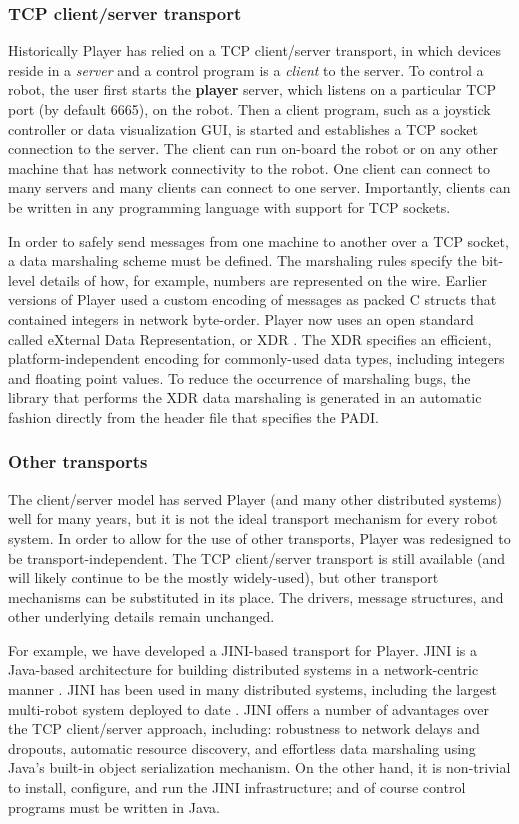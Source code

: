 \subsubsection{TCP client/server transport}
Historically Player has relied on a TCP client/server transport, in which
devices reside in a {\em server} and a control program is a {\em client} to
the server.  To control a robot, the user first starts the {\bf player}
server, which listens on a particular TCP port (by default 6665), on the
robot.  Then a client program, such as a joystick controller or data
visualization GUI, is started and establishes a TCP socket connection to
the server.  The client can run on-board the robot or on any other machine
that has network connectivity to the robot.  One client can connect to many
servers and many clients can connect to one server.  Importantly, clients
can be written in any programming language with support for TCP sockets.

In order to safely send messages from one machine to another over a TCP
socket, a data marshaling scheme must be defined.  The marshaling rules
specify the bit-level details of how, for example, numbers are represented
on the wire.  Earlier versions of Player used a custom encoding of messages
as packed C structs that contained integers in network byte-order.   Player
now uses an open standard called eXternal Data Representation, or XDR
\cite{32_RFC1014}.  The XDR specifies an efficient, platform-independent
encoding for commonly-used data types, including integers and floating
point values.  To reduce the occurrence of marshaling bugs, the library that
performs the XDR data marshaling is generated in an automatic fashion
directly from the header file that specifies the PADI.

\subsubsection{Other transports}
The client/server model has served Player (and many other distributed
systems) well for many years, but it is not the ideal transport mechanism
for every robot system.  In order to allow for the use of other transports,
Player was redesigned to be transport-independent.  The TCP client/server
transport is still available (and will likely continue to be the mostly
widely-used), but other transport mechanisms can be substituted in its
place.  The drivers, message structures, and other underlying details
remain unchanged.

For example, we have developed a JINI-based transport for Player.  JINI is
a Java-based architecture for building distributed systems in a
network-centric manner \cite{32_Waldo99}.  JINI has been used in many
distributed systems, including the largest multi-robot system deployed to
date \cite{32_iser04}.  JINI offers a number of advantages over the TCP
client/server approach, including: robustness to network delays and
dropouts, automatic resource discovery, and effortless data marshaling
using Java's built-in object serialization mechanism.  On the other
hand, it is non-trivial to install, configure, and run the JINI
infrastructure; and of course control programs must be written in Java.

